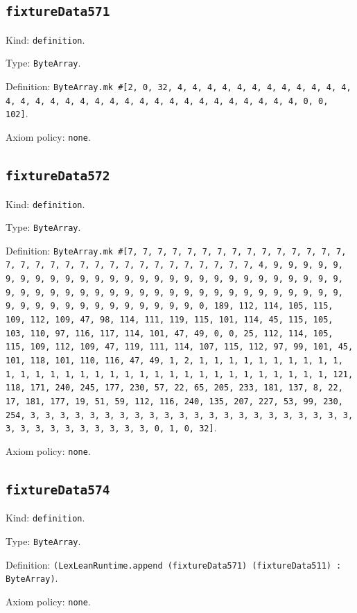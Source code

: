 \documentclass[11pt]{article}
\begin{document}
\subsection*{\texttt{fixtureData571}}
\noindent Kind: \texttt{definition}.\par
\noindent Type: \texttt{ByteArray}.\par
\noindent Definition: \texttt{ByteArray.mk \#[2, 0, 32, 4, 4, 4, 4, 4, 4, 4, 4, 4, 4, 4, 4, 4, 4, 4, 4, 4, 4, 4, 4, 4, 4, 4, 4, 4, 4, 4, 4, 4, 4, 4, 4, 0, 0, 102]}.\par
\noindent Axiom policy: \texttt{none}.\par
\subsection*{\texttt{fixtureData572}}
\noindent Kind: \texttt{definition}.\par
\noindent Type: \texttt{ByteArray}.\par
\noindent Definition: \texttt{ByteArray.mk \#[7, 7, 7, 7, 7, 7, 7, 7, 7, 7, 7, 7, 7, 7, 7, 7, 7, 7, 7, 7, 7, 7, 7, 7, 7, 7, 7, 7, 7, 7, 7, 7, 4, 9, 9, 9, 9, 9, 9, 9, 9, 9, 9, 9, 9, 9, 9, 9, 9, 9, 9, 9, 9, 9, 9, 9, 9, 9, 9, 9, 9, 9, 9, 9, 9, 9, 9, 9, 9, 9, 9, 9, 9, 9, 9, 9, 9, 9, 9, 9, 9, 9, 9, 9, 9, 9, 9, 9, 9, 9, 9, 9, 9, 9, 9, 9, 9, 0, 189, 112, 114, 105, 115, 109, 112, 109, 47, 98, 114, 111, 119, 115, 101, 114, 45, 115, 105, 103, 110, 97, 116, 117, 114, 101, 47, 49, 0, 0, 25, 112, 114, 105, 115, 109, 112, 109, 47, 119, 111, 114, 107, 115, 112, 97, 99, 101, 45, 101, 118, 101, 110, 116, 47, 49, 1, 2, 1, 1, 1, 1, 1, 1, 1, 1, 1, 1, 1, 1, 1, 1, 1, 1, 1, 1, 1, 1, 1, 1, 1, 1, 1, 1, 1, 1, 1, 1, 1, 1, 121, 118, 171, 240, 245, 177, 230, 57, 22, 65, 205, 233, 181, 137, 8, 22, 17, 181, 177, 19, 51, 59, 112, 116, 240, 135, 207, 227, 53, 99, 230, 254, 3, 3, 3, 3, 3, 3, 3, 3, 3, 3, 3, 3, 3, 3, 3, 3, 3, 3, 3, 3, 3, 3, 3, 3, 3, 3, 3, 3, 3, 3, 3, 3, 0, 1, 0, 32]}.\par
\noindent Axiom policy: \texttt{none}.\par
\subsection*{\texttt{fixtureData574}}
\noindent Kind: \texttt{definition}.\par
\noindent Type: \texttt{ByteArray}.\par
\noindent Definition: \texttt{(LexLeanRuntime.append (fixtureData571) (fixtureData511) : ByteArray)}.\par
\noindent Axiom policy: \texttt{none}.\par
\end{document}
